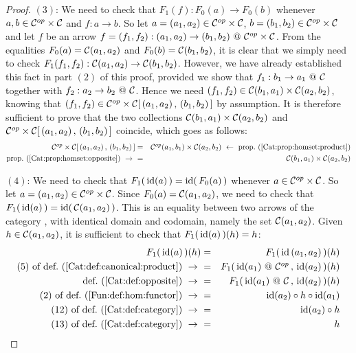 \begin{proof}
    $(3)$: We need to check that $F_{1}(f):F_{0}(a)\to F_{0}(b)$ whenever
    $a,b\in\mbox{${\cal C}^{op}$}\times\mbox{$\cal C$}$ and $f:a\to b$. So let $a=(a_{1},a_{2})\in\mbox{${\cal C}^{op}$}
    \times\mbox{$\cal C$}$, $b=(b_{1},b_{2})\in\mbox{${\cal C}^{op}$}\times\mbox{$\cal C$}$ and let $f$ be an 
    arrow $f=(f_{1},f_{2}):(a_{1},a_{2})\to(b_{1},b_{2})\ @\ \Cop\times\Cat$. 
    From the equalities $F_{0}(a)=\mbox{$\cal C$}(a_{1},a_{2})$ and $F_{0}(b)=\mbox{$\cal C$}
    (b_{1},b_{2})$, it is clear that we simply need to check 
    $F_{1}(f_{1},f_{2}):\mbox{$\cal C$}(a_{1},a_{2})\to \mbox{$\cal C$}(b_{1},b_{2})$.
    However, we have already established this fact in part $(2)$ of this 
    proof, provided we show that $f_{1}:b_{1}\to a_{1}\ @\ \mbox{$\cal C$}$ together 
    with $f_{2}:a_{2}\to b_{2}\ @\ \mbox{$\cal C$}$. Hence we need
    $(f_{1},f_{2})\in\mbox{$\cal C$}(b_{1},a_{1})\times\mbox{$\cal C$}(a_{2},b_{2})$, knowing
    that $(f_{1},f_{2})\in\mbox{${\cal C}^{op}$}\times\mbox{$\cal C$}[\,(a_{1},a_{2})\,,\,(b_{1},b_{2})
    \,]$ by assumption. It is therefore sufficient to prove that the 
    two collections $\mbox{$\cal C$}(b_{1},a_{1})\times\mbox{$\cal C$}(a_{2},b_{2})$ and
    $\mbox{${\cal C}^{op}$}\times\mbox{$\cal C$}[\,(a_{1},a_{2})\,,\,(b_{1},b_{2})\,]$ coincide, which 
    goes as follows:
        \begin{eqnarray*}\Cop\times\Cat[\,(a_{1},a_{2})\,,\,(b_{1},b_{2})\,]
            &=&\Cop(a_{1},b_{1})\times\Cat(a_{2},b_{2})\ \leftarrow\ 
            \mbox{prop.~(\ref{Cat:prop:homset:product})}\\
            \mbox{prop.~(\ref{Cat:prop:homset:opposite})}\ \to\ 
            &=&\Cat(b_{1},a_{1})\times\Cat(a_{2},b_{2})
        \end{eqnarray*}

    $(4)$: We need to check that $F_{1}(\,\mbox{\rm id}(a)\,)=\mbox{\rm id}(\,F_{0}(a)\,)$ whenever
    $a\in\mbox{${\cal C}^{op}$}\times\mbox{$\cal C$}$. So let $a=(a_{1},a_{2})\in\mbox{${\cal C}^{op}$}\times\mbox{$\cal C$}$. Since
    $F_{0}(a)=\mbox{$\cal C$}(a_{1},a_{2})$, we need to check that $F_{1}(\,\mbox{\rm id}(a)\,)
    =\mbox{\rm id}(\,\mbox{$\cal C$}(a_{1},a_{2})\,)$. This is an equality between two arrows
    of the category \Set, with identical domain and codomain, namely the set 
    $\mbox{$\cal C$}(a_{1},a_{2})$. Given $h\in\mbox{$\cal C$}(a_{1},a_{2})$, it is sufficient to 
    check that $F_{1}(\,\mbox{\rm id}(a)\,)(h)=h$:
        \begin{eqnarray*}F_{1}(\,\id(a)\,)(h)
            &=&F_{1}(\,\id\,(a_{1},a_{2})\,)(h)\\
            \mbox{$(5)$ of def.~(\ref{Cat:def:canonical:product})}\ \to\ 
            &=&F_{1}(\,\id(a_{1})\ @\ \Cop\,,\,\id(a_{2})\,)(h)\\
            \mbox{def.~(\ref{Cat:def:opposite})}\ \to\ 
            &=&F_{1}(\,\id(a_{1})\ @\ \Cat\,,\,\id(a_{2})\,)(h)\\
            \mbox{$(2)$ of def.~(\ref{Fun:def:hom:functor})}\ \to\ 
            &=&\id(a_{2})\circ h\circ \id(a_{1})\\
            \mbox{$(12)$ of def.~(\ref{Cat:def:category})}\ \to\ 
            &=&\id(a_{2})\circ h\\
            \mbox{$(13)$ of def.~(\ref{Cat:def:category})}\ \to\ 
            &=&h
        \end{eqnarray*}


\end{proof}
